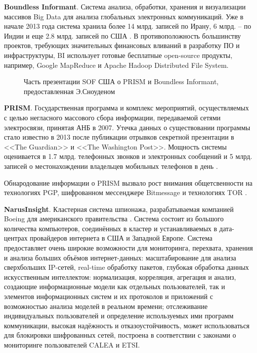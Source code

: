 	\textbf{Boundless Informant}. Система анализа, обработки, хранения и визуализации массивов Big Data для анализа глобальных электронных коммуникаций.  Уже в начале 2013 года система хранила более 14 млрд. записей по Ирану, 6 млрд. --  по Индии и еще 2.8 млрд. записей по США \cite{BoIn1}. %
	В противоположность большинству проектов, требующих значительных финансовых вливаний в разработку ПО и инфраструктуры, BI использует готовые бесплатные open-source продукты, например, Google MapReduce и  Apache Hadoop Distributed File System.
		\begin{figure*}[h!]
		\caption{ Часть презентации SOF США о PRISM и Boundless Informant, предоставленная Э.Сноуденом}
	\end{figure*} 
	\textbf{PRISM}.  Государственная программа и 	комплекс мероприятий, осуществляемых с целью  негласного массового  сбора информации, передаваемой   сетями электросвязи, принятая АНБ в 2007. Утечка данных о существовании программы стало известно в 2013 после публикации отрывков секретной презентации в   <<The Guardian>> и <<The Washington Post>>. Мощность системы оценивается в 1.7 млрд. телефонных звонков и электронных сообщений и 5 млрд. записей о местонахождении владельцев мобильных телефонов в день \cite{PRISM1} \cite{PRISM2}. %
	
	Обнародование информации о PRISM вызвало рост внимания общетсвенности на технологиях PGP, шифрованном мессенджере   Bitmessage и технологиях TOR  \cite{PRISM3}. %
	
	
	\textbf{NarusInsight}. Кластерная система шпионажа, разрабатываемая компанией Boeing для американского правительства \cite{Narus}. %
	Система состоит из большого количества компьютеров, соединённых в кластер и устанавливаемых в дата-центрах провайдеров интернета в США и Западной Европе. Система предоставляет очень широкие возможности для мониторинга, перехвата, хранения и анализа больших объёмов интернет-данных: масштабирование для анализа  сверхбольших IP-сетей, real-time обработку пакетов,  глубокая обработка данных искусственным интеллектом: нормализация, корреляция, агрегация и анализ, создающие информационные модели как отдельных пользователей, так и элементов информационных систем и их протоколов и приложений с возможностью анализа моделей в реальном времени; отслеживание индивидуальных пользователей и определение используемых  ими программ коммуникации, высокая надёжность и отказоустойчивость, может использоваться для блокировки шифрованных сетей,  построена в соответствии с законами о мониторинге пользователей CALEA и ETSI.
	
